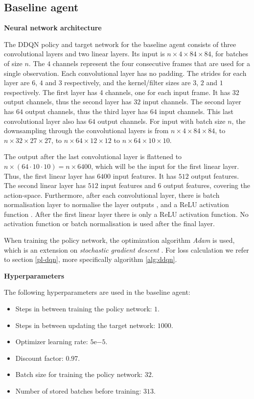 \subsection{Baseline agent}\label{appendix-baseline-pong}
\textbf{Neural network architecture}\par
\noindent The DDQN policy and target network for the baseline agent consists of three convolutional layers and two linear layers. Its input is $n \times 4 \times 84 \times 84$, for batches of size $n$. The $4$ channels represent the four consecutive frames that are used for a single observation. Each convolutional layer has no padding. The strides for each layer are $6$, $4$ and $3$ respectively, and the kernel/filter sizes are $3$, $2$ and $1$ respectively. The first layer has 4 channels, one for each input frame. It has $32$ output channels, thus the second layer has $32$ input channels. The second layer has $64$ output channels, thus the third layer has $64$ input channels. This last convolutional layer also has $64$ output channels. For input with batch size $n$, the downsampling through the convolutional layers is from $n \times 4 \times 84 \times 84$, to $n \times 32 \times 27 \times 27$, to $n \times 64 \times 12 \times 12$ to $n \times 64 \times 10 \times 10$. 

The output after the last convolutional layer is flattened to $n \times (64 \cdot 10 \cdot 10) = n \times 6400$, which will be the input for the first linear layer. Thus, the first linear layer has $6400$ input features. It has $512$ output features. The second linear layer has $512$ input features and $6$ output features, covering the action-space. Furthermore, after each convolutional layer, there is batch normalisation layer to normalise the layer outputs \cite{batchnorm}, and a ReLU activation function \cite{relu}. After the first linear layer there is only a ReLU activation function. No activation function or batch normalisation is used after the final layer.

When training the policy network, the optimization algorithm \emph{Adam} is used, which is an extension on \emph{stochastic gradient descent} \cite{adam}. For loss calculation we refer to section \ref{pl-dqn}, more specifically algorithm \ref{alg:ddqn}.

\noindent\textbf{Hyperparameters}\par
\noindent The following hyperparameters are used in the baseline agent:
\begin{itemize}
\item Steps in between training the policy network: $1$.
\item Steps in between updating the target network: $1000$.
\item Optimizer learning rate: $5\mathrm{e}{-5}$.
\item Discount factor: $0.97$.
\item Batch size for training the policy network: $32$.
\item Number of stored batches before training: $313$.
\end{itemize}

